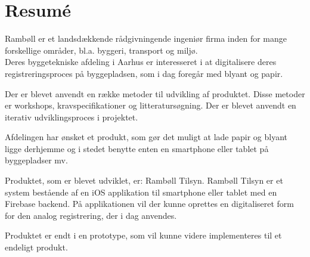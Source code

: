 \chapter*{Resumé}
Rambøll er et landsdækkende rådgivningende ingeniør firma inden for mange forskellige områder, bl.a. byggeri, transport og miljø. \\
Deres byggetekniske afdeling i Aarhus er interesseret i at digitalisere deres registreringsproces på byggepladsen, som i dag foregår med blyant og papir.

Der er blevet anvendt en række metoder til udvikling af produktet. Disse metoder er workshops, kravspecifikationer og litteratursøgning. Der er blevet anvendt en iterativ udviklingsproces i projektet.

Afdelingen har ønsket et produkt, som gør det muligt at lade papir og blyant ligge derhjemme og i stedet benytte enten en smartphone eller tablet på byggepladser mv.

Produktet, som er blevet udviklet, er: Rambøll Tilsyn. Rambøll Tilsyn er et system bestående af en iOS applikation til smartphone eller tablet med en Firebase backend.
På applikationen vil der kunne oprettes en digitaliseret form for den analog registrering, der i dag anvendes. 

Produktet er endt i en prototype, som vil kunne videre implementeres til et endeligt produkt.

\clearpage
